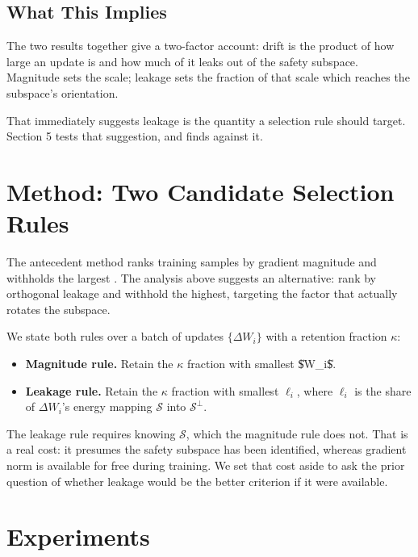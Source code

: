 \documentclass[10pt,twocolumn,letterpaper]{article}
\begin{document}
\subsection{What This Implies}


The two results together give a two-factor account: drift is the product of how large an update is and how much of it leaks out of the safety subspace. Magnitude sets the scale; leakage sets the fraction of that scale which reaches the subspace's orientation.

That immediately suggests leakage is the quantity a selection rule should target. Section 5 tests that suggestion, and finds against it.




\section{Method: Two Candidate Selection Rules}


The antecedent method ranks training samples by gradient magnitude and withholds the largest \cite{arxiv_2604_17215}. The analysis above suggests an alternative: rank by orthogonal leakage and withhold the highest, targeting the factor that actually rotates the subspace.

We state both rules over a batch of updates $\{\Delta W_i\}$ with a retention fraction $\kappa$:

\begin{itemize}
  \item \textbf{Magnitude rule.} Retain the $\kappa$ fraction with smallest \$\|\Delta W\_i\|\$.
  \item \textbf{Leakage rule.} Retain the $\kappa$ fraction with smallest $\ell_i$, where $\ell_i$ is the share of $\Delta W_i$'s energy mapping $\mathcal{S}$ into $\mathcal{S}^{\perp}$.
\end{itemize}

The leakage rule requires knowing $\mathcal{S}$, which the magnitude rule does not. That is a real cost: it presumes the safety subspace has been identified, whereas gradient norm is available for free during training. We set that cost aside to ask the prior question of whether leakage would be the better criterion if it were available.




\section{Experiments}
\end{document}
